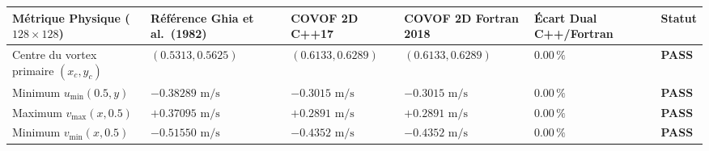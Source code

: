 \documentclass[
  10pt,
]{article}
\newcounter{none} %
\begin{document}
{\def\LTcaptype{none} %
\begin{longtable}[]{@{}
  >{\raggedright\arraybackslash}p{}
  >{\centering\arraybackslash}p{}
  >{\centering\arraybackslash}p{}
  >{\centering\arraybackslash}p{}
  >{\centering\arraybackslash}p{}
  >{\centering\arraybackslash}p{}@{}}
\toprule\noalign{}
\begin{minipage}[b]{\linewidth}\raggedright
Métrique Physique (\(128\times 128\))
\end{minipage} & \begin{minipage}[b]{\linewidth}\centering
Référence Ghia et al.~(1982)
\end{minipage} & \begin{minipage}[b]{\linewidth}\centering
COVOF 2D C++17
\end{minipage} & \begin{minipage}[b]{\linewidth}\centering
COVOF 2D Fortran 2018
\end{minipage} & \begin{minipage}[b]{\linewidth}\centering
Écart Dual C++/Fortran
\end{minipage} & \begin{minipage}[b]{\linewidth}\centering
Statut
\end{minipage} \\
\midrule\noalign{}
\endhead
\bottomrule\noalign{}
\endlastfoot
Centre du vortex primaire \((x_c, y_c)\) & \((0.5313, 0.5625)\) &
\textbf{\((0.6133, 0.6289)\)} & \textbf{\((0.6133, 0.6289)\)} &
\textbf{\(0.00\,\%\)} & \textbf{PASS} \\
Minimum \(u_{\min}(0.5, y)\) & \(-0.38289\text{ m/s}\) &
\textbf{\(-0.3015\text{ m/s}\)} & \textbf{\(-0.3015\text{ m/s}\)} &
\textbf{\(0.00\,\%\)} & \textbf{PASS} \\
Maximum \(v_{\max}(x, 0.5)\) & \(+0.37095\text{ m/s}\) &
\textbf{\(+0.2891\text{ m/s}\)} & \textbf{\(+0.2891\text{ m/s}\)} &
\textbf{\(0.00\,\%\)} & \textbf{PASS} \\
Minimum \(v_{\min}(x, 0.5)\) & \(-0.51550\text{ m/s}\) &
\textbf{\(-0.4352\text{ m/s}\)} & \textbf{\(-0.4352\text{ m/s}\)} &
\textbf{\(0.00\,\%\)} & \textbf{PASS} \\
\end{longtable}
}
\end{document}
